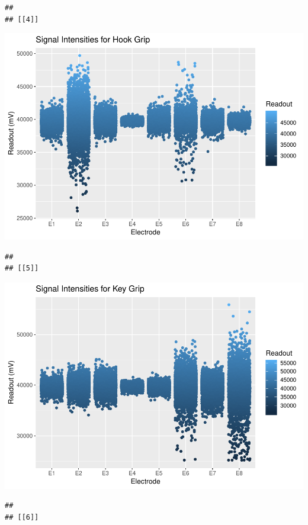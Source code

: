 \documentclass[]{article}
\begin{document}
\begin{verbatim}
## 
## [[4]]
\end{verbatim}

\includegraphics{Megahand_files/figure-latex/unnamed-chunk-5-4.pdf}

\begin{verbatim}
## 
## [[5]]
\end{verbatim}

\includegraphics{Megahand_files/figure-latex/unnamed-chunk-5-5.pdf}

\begin{verbatim}
## 
## [[6]]
\end{verbatim}
\end{document}
